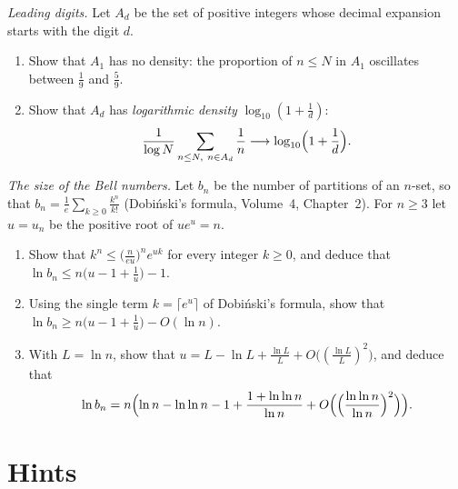 \begin{exercise}[$\star\star$]\label{pb:benford}
\emph{Leading digits.} Let $A_d$ be the set of positive integers whose decimal expansion starts with the digit $d$.
\begin{enumerate}[label=(\alph*)]
\item Show that $A_1$ has no density: the proportion of $n\le N$ in $A_1$ oscillates between $\frac19$ and $\frac59$.
\item Show that $A_d$ has \emph{logarithmic density} $\log_{10}(1+\frac1d)$:
\[
\frac1{\log N}\sum_{n\le N,\ n\in A_d}\frac1n\longrightarrow\log_{10}\Bigl(1+\frac1d\Bigr).
\]
\end{enumerate}
\end{exercise}

\begin{exercise}[$\star\star\star$]\label{pb:bellasym}
\emph{The size of the Bell numbers.} Let $b_n$ be the number of partitions of an $n$-set, so that $b_n=\frac1e\sum_{k\ge0}\frac{k^n}{k!}$ (Dobi\'nski's
formula, Volume~4, Chapter~2). For $n\ge3$ let $u=u_n$ be the positive root of $ue^u=n$.
\begin{enumerate}[label=(\alph*)]
\item Show that $k^n\le\bigl(\frac n{eu}\bigr)^ne^{uk}$ for every integer $k\ge0$, and deduce that $\ln b_n\le n\bigl(u-1+\frac1u\bigr)-1$.
\item Using the single term $k=\lceil e^u\rceil$ of Dobi\'nski's formula, show that $\ln b_n\ge n\bigl(u-1+\frac1u\bigr)-O(\ln n)$.
\item With $L=\ln n$, show that $u=L-\ln L+\frac{\ln L}L+O\bigl((\frac{\ln L}L)^2\bigr)$, and deduce that
\[
\ln b_n=n\Bigl(\ln n-\ln\ln n-1+\frac{1+\ln\ln n}{\ln n}+O\Bigl(\Bigl(\frac{\ln\ln n}{\ln n}\Bigr)^2\Bigr)\Bigr).
\]
\end{enumerate}
\end{exercise}

\section{Hints}

